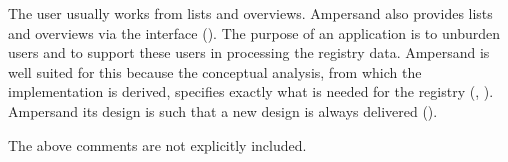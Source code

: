 The user usually works from lists and overviews.
Ampersand also provides lists and overviews via the interface ().
The purpose of an application is to unburden users and to support these users in processing the registry data.
Ampersand is well suited for this because the conceptual analysis, from which the implementation is derived, specifies exactly what is needed for the registry (, ).
Ampersand its design is such that a new design is always delivered ().
\label{s:4_9_excluded}

The above comments are not explicitly included.